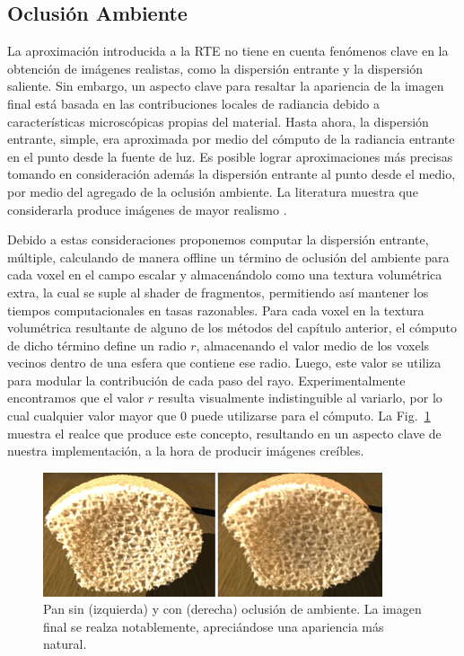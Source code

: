 \subsection{Oclusión Ambiente}

La aproximación introducida a la RTE no tiene en cuenta fenómenos clave en la obtención de imágenes realistas, como la dispersión entrante y la dispersión saliente.
Sin embargo, un aspecto clave para resaltar la apariencia de la imagen final está basada en las contribuciones locales de radiancia debido a características microscópicas propias del material.
Hasta ahora, la dispersión entrante, simple, era aproximada por medio del cómputo de la radiancia entrante en el punto desde la fuente de luz.
Es posible lograr aproximaciones más precisas tomando en consideración además la dispersión entrante al punto desde el medio, por medio del agregado de la oclusión ambiente.
La literatura muestra que considerarla produce imágenes de mayor realismo \cite{Hernell2010}.

Debido a estas consideraciones proponemos computar la dispersión entrante, múltiple, calculando de manera offline un término de oclusión del ambiente para cada voxel en el campo escalar y almacenándolo como una textura volumétrica extra, la cual se suple al shader de fragmentos, permitiendo así mantener los tiempos computacionales en tasas razonables.
Para cada voxel en la textura volumétrica resultante de alguno de los métodos del capítulo anterior, el cómputo de dicho término define un radio $r$, almacenando el valor medio de los voxels vecinos dentro de una esfera que contiene ese radio.
Luego, este valor se utiliza para modular la contribución de cada paso del rayo.
Experimentalmente encontramos que el valor $r$ resulta visualmente indistinguible al variarlo, por lo cual cualquier valor mayor que $0$ puede utilizarse para el cómputo.
La Fig.~\ref{fg:occlusion} muestra el realce que produce este concepto, resultando en un aspecto clave de nuestra implementación, a la hora de producir imágenes creíbles. 



\begin{figure}
\centerline{\includegraphics[width=10cm]{figures/occlusion}}
  \caption[Pan renderizado sin y con oclusión de ambiente]{Pan sin (izquierda) y con (derecha) oclusión de ambiente. La imagen final se realza notablemente, apreciándose una apariencia más natural.}
  \label{fg:occlusion}
\end{figure}
 
